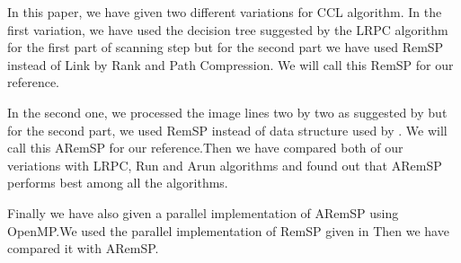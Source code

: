 In this paper, we have given two different variations for CCL algorithm. In the first variation, we have used the 
decision tree suggested by the LRPC algorithm for the first part of scanning step but for the second part we have used
RemSP instead of Link by Rank and Path Compression. We will call this RemSP for our reference.

In the second one, we processed the image lines two by two as suggested by \cite{He2012_ARun} but for the second part,
we used RemSP instead of data structure used by \cite{He2012_ARun}. We will call this ARemSP for our reference.Then we
have compared both of our veriations with LRPC, Run and Arun algorithms and
found out that ARemSP performs best among all the algorithms.

Finally we have also given a parallel implementation of ARemSP using OpenMP.We used the parallel implementation of 
RemSP given in \cite{Patwary2012_PARemSP} Then we have compared it with ARemSP.
